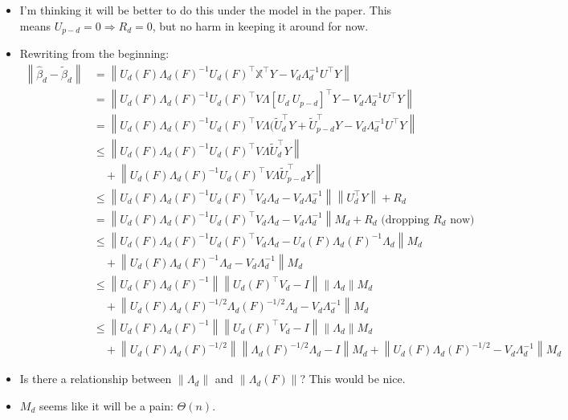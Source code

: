 \documentclass[11pt]{article}
\newcommand{\norm}[1]{\left\lVert #1 \right\rVert}
\newcommand{\X}{\mathbb{X}}
\begin{document}
 \begin{itemize}
 \item I'm thinking it will be better to do this under the model in the
   paper. This means $U_{p-d}=0\Rightarrow R_d=0$, but no harm in
   keeping it around for now.
 \item Rewriting from the beginning:
   \begin{align}
     \norm{\hat\beta_d-\tilde\beta_d} 
     &= \norm{ U_d(F )\Lambda_d(F )^{-1}U_d(F )^\top \X^\top
       Y - V_d\Lambda_d^{-1}U^\top Y}\\
     &= \norm{U_d(F )\Lambda_d(F )^{-1}U_d(F )^\top V\Lambda[U_d\ U_{p-d}]^\top
       Y - V_d\Lambda_d^{-1}U^\top Y}\\
     &= \norm{U_d(F )\Lambda_d(F )^{-1}U_d(F )^\top V\Lambda(\tilde
       U_d^\top Y +\tilde U_{p-d}^\top Y
       - V_d\Lambda_d^{-1}U^\top Y}\\
     &\leq \norm{U_d(F )\Lambda_d(F )^{-1}U_d(F )^\top V\Lambda\tilde
       U_d^\top Y}\\
     &\quad + \norm{U_d(F )\Lambda_d(F )^{-1}U_d(F )^\top V\Lambda
       \tilde U_{p-d}^\top Y}\\
     &\leq \norm{U_d(F)\Lambda_d(F)^{-1}U_d(F)^\top V_d\Lambda_d -
       V_d\Lambda_d^{-1}} \norm{U_d^\top Y} + R_d\\
     &=\norm{U_d(F)\Lambda_d(F)^{-1}U_d(F)^\top V_d\Lambda_d -
       V_d\Lambda_d^{-1}} M_d + R_d \mbox{ (dropping $R_d$ now)}\\
     &\leq \norm{U_d(F)\Lambda_d(F)^{-1}U_d(F)^\top V_d\Lambda_d -
       U_d(F)\Lambda_d(F)^{-1}\Lambda_d}M_d\\
     &\quad + \norm{U_d(F)\Lambda_d(F)^{-1}\Lambda_d -
       V_d\Lambda_d^{-1}} M_d\\
     &\leq \norm{U_d(F)\Lambda_d(F)^{-1}}\norm{U_d(F)^\top
       V_d-I}\norm{\Lambda_d} M_d\\
     &\quad +\norm{U_d(F)\Lambda_d(F)^{-1/2}\Lambda_d(F)^{-1/2}\Lambda_d -
       V_d\Lambda_d^{-1}} M_d\\
     &\leq \norm{U_d(F)\Lambda_d(F)^{-1}}\norm{U_d(F)^\top
       V_d-I}\norm{\Lambda_d} M_d\\
     &\quad
       +\norm{U_d(F)\Lambda_d(F)^{-1/2}}\norm{\Lambda_d(F)^{-1/2}\Lambda_d
       - I}M_d + \norm{U_d(F)\Lambda_d(F)^{-1/2}-
       V_d\Lambda_d^{-1}} M_d
   \end{align}
 \item Is there a relationship between $\norm{\Lambda_d}$ and
   $\norm{\Lambda_d(F)}$? This would be nice.
 \item $M_d$ seems like it will be a pain: $\Theta(n)$.
 \end{itemize}
\end{document}
